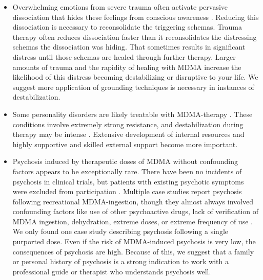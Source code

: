 \documentclass[12pt,letterpaper]{article}
\begin{document}
\begin{itemize}
    \item Overwhelming emotions from severe trauma often activate pervasive dissociation that hides these feelings from conscious awareness \cite{razviPSIP}. Reducing this dissociation is necessary to reconsolidate the triggering schemas. Trauma therapy often reduces dissociation faster than it reconsolidates the distressing schemas the dissociation was hiding. That sometimes results in significant distress until those schemas are healed through further therapy. Larger amounts of trauma and the rapidity of healing with MDMA increase the likelihood of this distress becoming destabilizing or disruptive to your life. We suggest more application of grounding techniques is necessary in instances of destabilization.   
    \item Some personality disorders are likely treatable with MDMA-therapy \cite{traynorBorderline}. These conditions involve extremely strong resistance, and destabilization during therapy may be intense \cite{razviPSIP}. Extensive development of internal resources and highly supportive and skilled external support become more important.
    \item Psychosis induced by therapeutic doses of MDMA without confounding factors appears to be exceptionally rare. There have been no incidents of psychosis in clinical trials, but patients with existing psychotic symptoms were excluded from participation \cite{smithSystematic,mitchellMDMAClinicalTrial2}. Multiple case studies report psychosis following recreational MDMA-ingestion, though they almost always involved confounding factors like use of other psychoactive drugs, lack of verification of MDMA ingestion, dehydration, extreme doses, or extreme frequency of use \cite{mcguirePsychosis,patelPsychosis,vaivaPsychosis}. We only found one case study describing psychosis following a single purported dose. Even if the risk of MDMA-induced psychosis is very low, the consequences of psychosis are high. Because of this, we suggest that a family or personal history of psychosis is a strong indication to work with a professional guide or therapist who understands psychosis well. 

\end{itemize}
\end{document}
